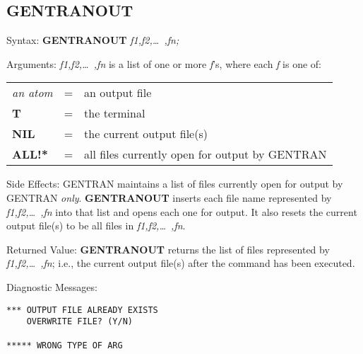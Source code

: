 \subsection{GENTRANOUT}
\begin{describe}{Syntax:}
{\bf GENTRANOUT} {\it f1,f2,\dots\ ,fn;}
\end{describe}
\begin{describe}{Arguments:}
{\it f1,f2,\dots\ ,fn\/} is a list of one or more {\it f\/}'s, where each 
{\it f\/} is one of:
\begin{center}
\begin{tabular}{lll}
{\it an atom} & = & an output file\\
{\bf T} & = & the terminal\\
{\bf NIL} & = & the current output file(s)\\
{\bf ALL!*} & = & all files currently open for output by GENTRAN\\
\end{tabular}
\end{center}
\end{describe}
\begin{describe}{Side Effects:}
GENTRAN maintains a list of files currently open for output by
GENTRAN {\it only}.  {\bf GENTRANOUT} inserts each file name represented by
{\it f1,f2,\dots\ ,fn\/} into that list and opens each one for output.  It
also resets the current output file(s) to be all files in {\it f1,f2,\dots\ ,fn}.
\end{describe}
\begin{describe}{Returned Value:}
{\bf GENTRANOUT} returns the list of files represented by
{\it f1,f2,\dots\ ,fn\/};
i.e., the current output file(s) after the command has been executed.
\end{describe}
\begin{describe}{Diagnostic Messages:}
\begin{verbatim}
*** OUTPUT FILE ALREADY EXISTS
    OVERWRITE FILE? (Y/N)

***** WRONG TYPE OF ARG
\end{verbatim}
\end{describe}
